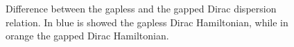 \begin{figure}[h]
    \caption{Difference between the gapless and the gapped Dirac dispersion relation. In blue is showed the gapless Dirac Hamiltonian, while in orange the gapped Dirac Hamiltonian.}
    \label{fig:dispersion-1D}
\end{figure}